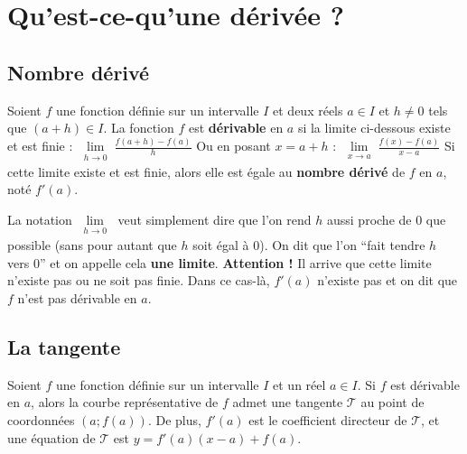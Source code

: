 



	\section{Qu'est-ce-qu'une dérivée ?}

	\subsection{Nombre dérivé}

	\begin{formula}[Définition]
		Soient $f$ une fonction définie sur un intervalle $I$ et deux réels $a \in I$ et $h \neq 0$ tels que $(a + h) \in I$.
		\newpar
		La fonction $f$ est \textbf{dérivable} en $a$ si la limite ci-dessous existe et est finie :
		\newpar
		$\displaystyle{\lim\limits_{\substack{h \rightarrow 0}} \frac{f(a + h) - f(a)}{h}}$
		\newpar
		Ou en posant $x = a + h$ :
		\newpar
		$\displaystyle{\lim\limits_{\substack{x \rightarrow a}} \frac{f(x) - f(a)}{x-a}}$
		\newpar
		Si cette limite existe et est finie, alors elle est égale au \textbf{nombre dérivé} de $f$ en $a$, noté $f'(a)$.
	\end{formula}

	\begin{tip}
		La notation $\displaystyle{\lim\limits_{\substack{h \rightarrow 0}}}$ veut simplement dire que l'on rend $h$ aussi proche de $0$ que possible (sans pour autant que $h$ soit égal à $0$). On dit que l'on ``fait tendre $h$ vers $0$'' et on appelle cela \textbf{une limite}.
		\newpar
		\textbf{Attention !} Il arrive que cette limite n'existe pas ou ne soit pas finie. Dans ce cas-là, $f'(a)$ n'existe pas et on dit que $f$ n'est pas dérivable en $a$.
	\end{tip}

	\subsection{La tangente}

	\begin{formula}
		Soient $f$ une fonction définie sur un intervalle $I$ et un réel $a \in I$. Si $f$ est dérivable en $a$, alors la courbe représentative de $f$ admet une tangente $\mathcal{T}$ au point de coordonnées $(a; f(a))$.
		\newpar
		De plus, $f'(a)$ est le coefficient directeur de $\mathcal{T}$, et une équation de $\mathcal{T}$ est $y = f'(a)(x-a)+f(a)$.
	\end{formula}

